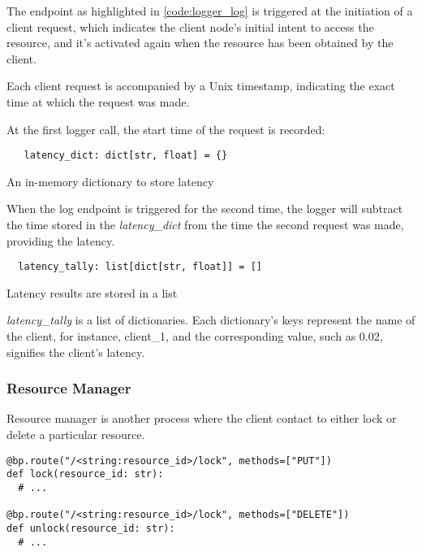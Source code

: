 The endpoint as highlighted in \ref{code:logger_log} is triggered at the initiation of a client request, which indicates the client node's initial intent to access the resource, and it's activated again when the resource has been obtained by the client. 

Each client request is accompanied by a Unix timestamp, indicating the exact time at which the request was made.

At the first logger call, the start time of the request is recorded:

\begin{listing}[!ht]
  \begin{verbatim}
   latency_dict: dict[str, float] = {}
  \end{verbatim}
  \caption{An in-memory dictionary to store latency}
  \label{code:latency_dict}
\end{listing}

When the log endpoint is triggered for the second time, the logger will subtract the time stored in the \textit{latency\_dict} from the time the second request was made, providing the latency.

\begin{listing}[!ht]
  \begin{verbatim}
  latency_tally: list[dict[str, float]] = []
  \end{verbatim}
  \caption{Latency results are stored in a list}
  \label{code:latency_tally}
\end{listing}

\textit{latency\_tally} is a list of dictionaries. Each dictionary's keys represent the name of the client, for instance, client\_1, and the corresponding value, such as 0.02, signifies the client's latency.


\subsubsection{Resource Manager}
\label{subsubsec:resource_manager}

Resource manager is another process where the client contact to either lock or
delete a particular resource.

\begin{listing}[!ht]
  \begin{verbatim}
@bp.route("/<string:resource_id>/lock", methods=["PUT"])
def lock(resource_id: str):
  # ...

@bp.route("/<string:resource_id>/lock", methods=["DELETE"])
def unlock(resource_id: str):
  # ...
  \end{verbatim}
\end{listing}

